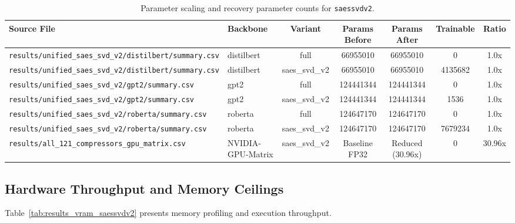 \begin{table}[t]
\centering
\small
\begin{tabular}{llccccc}
\toprule
\textbf{Source File} & \textbf{Backbone} & \textbf{Variant} & \textbf{Params Before} & \textbf{Params After} & \textbf{Trainable} & \textbf{Ratio} \\
\midrule
\texttt{results/unified\_saes\_svd\_v2/distilbert/summary.csv} & distilbert & full & 66955010 & 66955010 & 0 & 1.0x \\
\texttt{results/unified\_saes\_svd\_v2/distilbert/summary.csv} & distilbert & saes\_svd\_v2 & 66955010 & 66955010 & 4135682 & 1.0x \\
\texttt{results/unified\_saes\_svd\_v2/gpt2/summary.csv} & gpt2 & full & 124441344 & 124441344 & 0 & 1.0x \\
\texttt{results/unified\_saes\_svd\_v2/gpt2/summary.csv} & gpt2 & saes\_svd\_v2 & 124441344 & 124441344 & 1536 & 1.0x \\
\texttt{results/unified\_saes\_svd\_v2/roberta/summary.csv} & roberta & full & 124647170 & 124647170 & 0 & 1.0x \\
\texttt{results/unified\_saes\_svd\_v2/roberta/summary.csv} & roberta & saes\_svd\_v2 & 124647170 & 124647170 & 7679234 & 1.0x \\
\texttt{results/all\_121\_compressors\_gpu\_matrix.csv} & NVIDIA-GPU-Matrix & saes\_svd\_v2 & Baseline FP32 & Reduced (30.96x) & 0 & 30.96x \\
\bottomrule
\end{tabular}
\caption{Parameter scaling and recovery parameter counts for \texttt{saessvdv2}.}
\label{tab:results_params_saessvdv2}
\end{table}

\subsection{Hardware Throughput and Memory Ceilings}
Table~\ref{tab:results_vram_saessvdv2} presents memory profiling and execution throughput.

